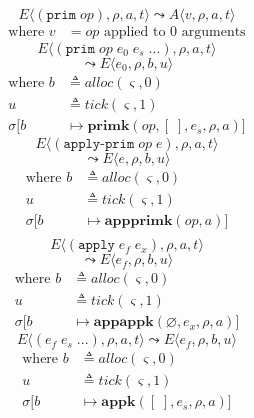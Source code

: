 \documentclass[12pt,draft]{article}
\newcommand{\primsyn}[2]{(\texttt{prim}\;#1\;#2\;...)}
\newcommand{\singleprimsyn}[1]{(\texttt{prim}\;#1)}
\newcommand{\applyprimsyn}[2]{(\texttt{apply-prim}\;#1\;#2)}
\newcommand{\applysyn}[2]{(\texttt{apply}\;#1\;#2)}
\begin{document}
\begin{multicols*}{2}
\vspace{-5mm}
\[
E\langle
\singleprimsyn{op} , \rho , a , t
\rangle
\leadsto
A\langle
v , \rho , a , t
\rangle
\]
\vspace{-13mm}
\begin{align*}
\text{where } v &= op \text{ applied to } 0 \text{ arguments}
\end{align*}
\vspace{-5mm}
\[
E\langle
\primsyn{op}{e_0\;e_s} , \rho , a , t
\rangle
\]
\vspace{-7mm}
\[
\leadsto
E\langle
e_0 , \rho , b , u
\rangle
\]
\vspace{-10mm}
\begin{align*}
\text{where } b &\triangleq alloc(\varsigma, 0) \\
u &\triangleq tick(\varsigma, 1) \\
\sigma[b &\mapsto \textbf{primk}(op, [\;], e_s, \rho, a)]
\end{align*}
\vspace{-5mm}
\[
E\langle
\applyprimsyn{op}{e} , \rho , a , t
\rangle
\]
\vspace{-7mm}
\[
\leadsto
E\langle
e , \rho , b , u
\rangle
\]
\vspace{-12mm}
\begin{align*}
\text{where } b &\triangleq alloc(\varsigma, 0) \\
u &\triangleq tick(\varsigma, 1) \\
\sigma[b &\mapsto \textbf{appprimk}(op, a)] \\
\end{align*}
\vspace{-12mm}
\[
E\langle
\applysyn{e_f}{e_x} , \rho , a , t
\rangle
\]
\vspace{-8mm}
\[
\leadsto
E\langle
e_f , \rho , b , u
\rangle
\]
\vspace{-11mm}
\begin{align*}
\text{where } b &\triangleq alloc(\varsigma, 0) \\
u &\triangleq tick(\varsigma, 1) \\
\sigma[b &\mapsto \textbf{appappk}(\varnothing , e_x , \rho, a)]
\end{align*}
\vspace{-5mm}
\[
E\langle
(e_f\;e_s\;...) , \rho , a , t
\rangle
\leadsto
E\langle
e_f , \rho , b , u
\rangle
\]
\vspace{-11mm}
\begin{align*}
\text{where } b &\triangleq alloc(\varsigma, 0) \\
u &\triangleq tick(\varsigma, 1) \\
\sigma[b &\mapsto \textbf{appk}([\;],  e_s , \rho, a)] \\
\end{align*}
\end{multicols*}
\end{document}
